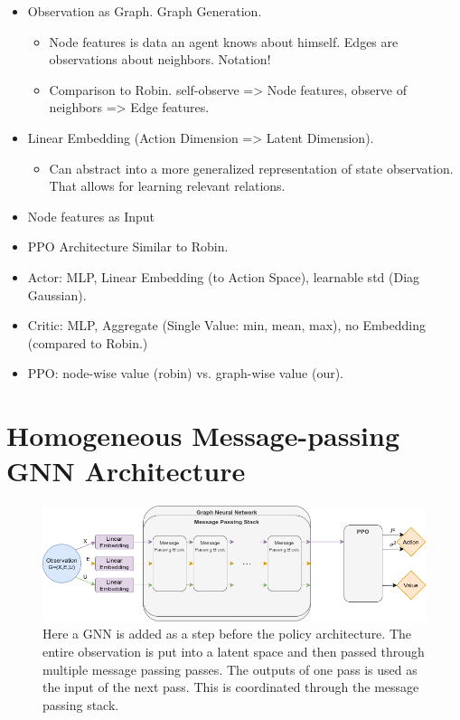 \begin{itemize}[noitemsep,nolistsep]
    \item Observation as Graph. Graph Generation.
    \begin{itemize}[noitemsep,nolistsep]
        \item Node features is data an agent knows about himself. Edges are observations about neighbors. Notation!
        \item Comparison to Robin. self-observe => Node features,  observe of neighbors => Edge features.
    \end{itemize}
    \item Linear Embedding (Action Dimension => Latent Dimension).
    \begin{itemize}[noitemsep,nolistsep]
        \item Can abstract into a more generalized representation of state observation. That allows for learning relevant relations.
    \end{itemize}
    \item Node features as Input
    \item PPO Architecture Similar to Robin. 
    \item Actor: MLP, Linear Embedding (to Action Space), learnable std (Diag Gaussian).
    \item Critic: MLP, Aggregate (Single Value: min, mean, max), no Embedding (compared to Robin.)
    \item PPO: node-wise value (robin) vs. graph-wise value (our).
\end{itemize}





\section{Homogeneous Message-passing GNN Architecture}
\begin{figure}[htp]
    \centering
    \includegraphics[width=1.0\textwidth]{figures/homogeneous_gnn.png}
    \hspace{1cm}   
    \caption{Here a GNN is added as a step before the policy architecture. The entire observation is put into a latent space and then passed through multiple message passing passes. The outputs of one pass is used as the input of the next pass. This is coordinated through the message passing stack.}
    \label{fig:homogeneous_gnn}
\end{figure}

